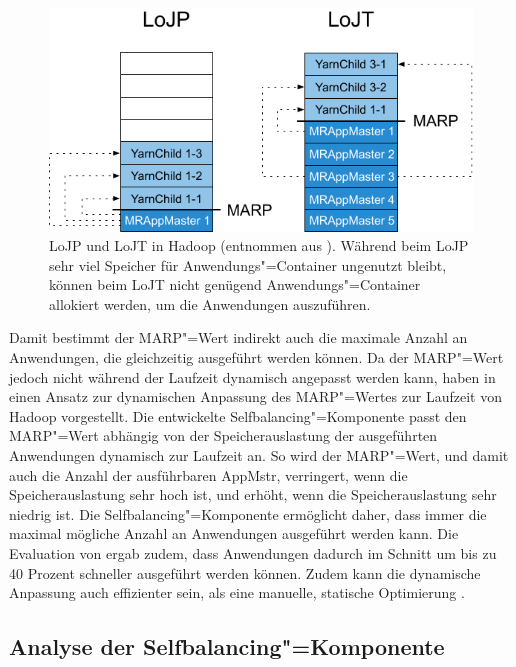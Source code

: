 \begin{figure}[h]
    \includegraphics{./resources/marpValue.pdf}
    \caption[LoJP und LoJT in Hadoop]
    {LoJP und LoJT in Hadoop (entnommen aus \cite{Zhang2016}).
        Während beim LoJP sehr viel Speicher für Anwendungs"=Container ungenutzt bleibt, können beim LoJT nicht genügend Anwendungs"=Container allokiert werden, um die Anwendungen auszuführen.}
    \label{fig:marpValue}
\end{figure}

Damit bestimmt der \gls{MARP}"=Wert indirekt auch die maximale Anzahl an Anwendungen, die gleichzeitig ausgeführt werden können.
Da der \gls{MARP}"=Wert jedoch nicht während der Laufzeit dynamisch angepasst werden kann, haben \citeauthor{Zhang2016} in \cite{Zhang2016} einen Ansatz zur dynamischen Anpassung des \gls{MARP}"=Wertes zur Laufzeit von Hadoop vorgestellt.
Die entwickelte Selfbalancing"=Komponente passt den \gls{MARP}"=Wert abhängig von der Speicherauslastung der ausgeführten Anwendungen dynamisch zur Laufzeit an.
So wird der \gls{MARP}"=Wert, und damit auch die Anzahl der ausführbaren \gls{AppMstr}, verringert, wenn die Speicherauslastung sehr hoch ist, und erhöht, wenn die Speicherauslastung sehr niedrig ist.
Die Selfbalancing"=Komponente ermöglicht daher, dass immer die maximal mögliche Anzahl an Anwendungen ausgeführt werden kann.
Die Evaluation von \citeauthor{Zhang2016} ergab zudem, dass Anwendungen dadurch im Schnitt um bis zu 40 Prozent schneller ausgeführt werden können.
Zudem kann die dynamische Anpassung auch effizienter sein, als eine manuelle, statische Optimierung \cite{Zhang2016}.

\subsection{Analyse der Selfbalancing"=Komponente}
\label{subsec:selfbalancingAnalysis}


